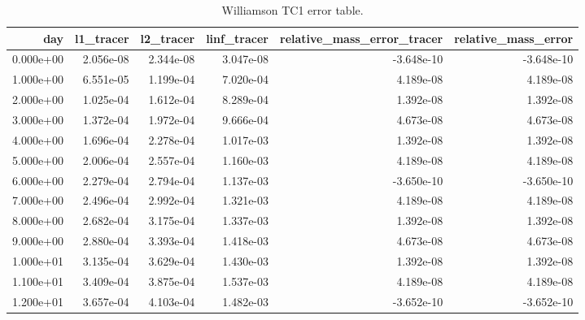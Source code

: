 \begin{table}[htbp]
\centering
{}
\begin{tabular}{rrrrrr}
\toprule
day & l1\_tracer & l2\_tracer & linf\_tracer & relative\_mass\_error\_tracer & relative\_mass\_error \\
\midrule
0.000e+00 & 2.056e-08 & 2.344e-08 & 3.047e-08 & -3.648e-10 & -3.648e-10 \\
1.000e+00 & 6.551e-05 & 1.199e-04 & 7.020e-04 & 4.189e-08 & 4.189e-08 \\
2.000e+00 & 1.025e-04 & 1.612e-04 & 8.289e-04 & 1.392e-08 & 1.392e-08 \\
3.000e+00 & 1.372e-04 & 1.972e-04 & 9.666e-04 & 4.673e-08 & 4.673e-08 \\
4.000e+00 & 1.696e-04 & 2.278e-04 & 1.017e-03 & 1.392e-08 & 1.392e-08 \\
5.000e+00 & 2.006e-04 & 2.557e-04 & 1.160e-03 & 4.189e-08 & 4.189e-08 \\
6.000e+00 & 2.279e-04 & 2.794e-04 & 1.137e-03 & -3.650e-10 & -3.650e-10 \\
7.000e+00 & 2.496e-04 & 2.992e-04 & 1.321e-03 & 4.189e-08 & 4.189e-08 \\
8.000e+00 & 2.682e-04 & 3.175e-04 & 1.337e-03 & 1.392e-08 & 1.392e-08 \\
9.000e+00 & 2.880e-04 & 3.393e-04 & 1.418e-03 & 4.673e-08 & 4.673e-08 \\
1.000e+01 & 3.135e-04 & 3.629e-04 & 1.430e-03 & 1.392e-08 & 1.392e-08 \\
1.100e+01 & 3.409e-04 & 3.875e-04 & 1.537e-03 & 4.189e-08 & 4.189e-08 \\
1.200e+01 & 3.657e-04 & 4.103e-04 & 1.482e-03 & -3.652e-10 & -3.652e-10 \\
\bottomrule
\end{tabular}
\caption{Williamson TC1 error table.}
\end{table}
